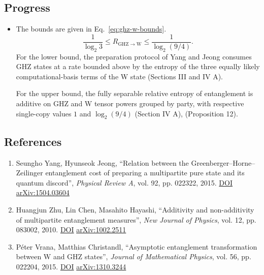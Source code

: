 \subsection*{Progress}

\begin{itemize}
  \item The bounds are given in Eq.~\eqref{eq:ghz-w-bounds}.
\begin{equation}
  \frac{1}{\log_2 3}\leq R_{\mathrm{GHZ}\to\mathrm{W}}\leq\frac{1}{\log_2(9/4)}.
  \label{eq:ghz-w-bounds}
\end{equation}
For the lower bound, the preparation protocol of Yang and Jeong consumes GHZ states at a rate bounded above by the entropy of the three equally likely computational-basis terms of the W state  (Sections III and IV A).

For the upper bound, the fully separable relative entropy of entanglement is additive on GHZ and W tensor powers grouped by party, with respective single-copy values $1$ and $\log_2(9/4)$  (Section IV A),  (Proposition 12).
\end{itemize}

\subsection*{References}

\begin{enumerate}[label={},leftmargin=4.8em,labelsep=0.5em]
  \footnotesize
  \item[\textup{[YJ15]}]\label{ref:c5a06d-yj15}
  Seungho Yang, Hyunseok Jeong, “Relation between the Greenberger--Horne--Zeilinger entanglement cost of preparing a multipartite pure state and its quantum discord”, \emph{Physical Review A}, vol. 92, pp. 022322, 2015.
\href{https://doi.org/10.1103/PhysRevA.92.022322}{DOI}
\href{https://arxiv.org/abs/1504.03604}{arXiv:1504.03604}

  \item[\textup{[ZCH10]}]\label{ref:c5a06d-zch10}
  Huangjun Zhu, Lin Chen, Masahito Hayashi, “Additivity and non-additivity of multipartite entanglement measures”, \emph{New Journal of Physics}, vol. 12, pp. 083002, 2010.
\href{https://doi.org/10.1088/1367-2630/12/8/083002}{DOI}
\href{https://arxiv.org/abs/1002.2511}{arXiv:1002.2511}

  \item[\textup{[VC15]}]\label{ref:c5a06d-vc15}
  P{\'e}ter Vrana, Matthias Christandl, “Asymptotic entanglement transformation between W and GHZ states”, \emph{Journal of Mathematical Physics}, vol. 56, pp. 022204, 2015.
\href{https://doi.org/10.1063/1.4908106}{DOI}
\href{https://arxiv.org/abs/1310.3244}{arXiv:1310.3244}
\end{enumerate}

